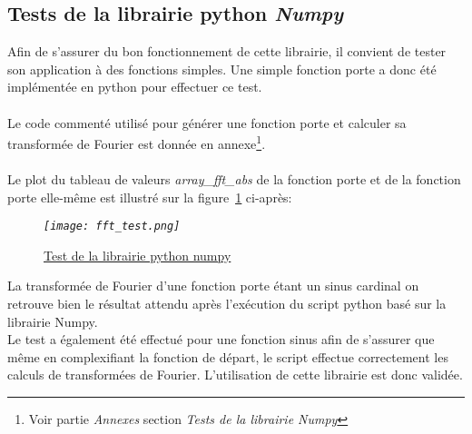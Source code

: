 \documentclass[12pt,fleqn]{book} %
\begin{document}
\subsection{Tests de la librairie python \emph{Numpy}}
Afin de s'assurer du bon fonctionnement de cette librairie, il convient de tester son application à des fonctions simples. Une simple fonction porte a donc été implémentée en python pour effectuer ce test.
~\\\\Le code commenté utilisé pour générer une fonction porte et calculer sa transformée de Fourier est donnée en annexe\footnote{Voir partie \emph{Annexes} section \emph{Tests de la librairie Numpy}}.
~\\\\Le plot du tableau de valeurs \emph{array\_fft\_abs} de la fonction porte et de la fonction porte elle-même est illustré sur la figure~\underline{\color{blue}\ref{fft_test}} ci-après:
\begin{figure}[H]
	\centering
	\itshape
	\texttt{[image: fft\_test.png]}
	\caption{\label{fft_test} \underline{Test de la librairie python numpy}}
\end{figure}
La transformée de Fourier d'une fonction porte étant un sinus cardinal on retrouve bien le résultat attendu après l'exécution du script python basé sur la librairie Numpy.
~\\Le test a également été effectué pour une fonction sinus afin de s'assurer que même en complexifiant la fonction de départ, le script effectue correctement les calculs de transformées de Fourier. L'utilisation de cette librairie est donc validée.
\end{document}
